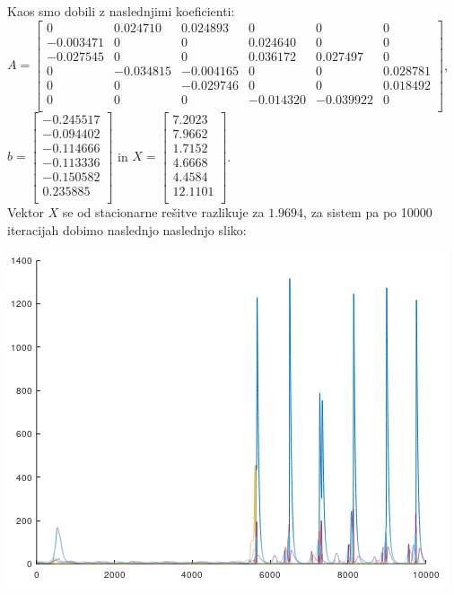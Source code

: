 \documentclass[a4paper, 12pt]{article}
\begin{document}
Kaos smo dobili z naslednjimi koeficienti:\\
$ A =
\begin{bmatrix}
	0 & 0.024710 & 0.024893 & 0 & 0 & 0 \\
	-0.003471 & 0 & 0 & 0.024640 & 0 & 0 \\
	-0.027545 & 0 & 0 & 0.036172 & 0.027497 & 0 \\
	0 & -0.034815 & -0.004165 & 0 & 0 & 0.028781 \\
	0 & 0 & -0.029746 & 0 & 0 & 0.018492 \\
	0 & 0 & 0 & -0.014320 & -0.039922 & 0 \\
\end{bmatrix} $, 
$ b =
\begin{bmatrix}
	-0.245517 \\
	-0.094402 \\
	-0.114666 \\
	-0.113336 \\
	-0.150582 \\
	0.235885 \\
\end{bmatrix} $ in
$ X =
\begin{bmatrix}
	7.2023 \\
	7.9662 \\
	1.7152 \\
	4.6668 \\
	4.4584 \\
	12.1101 \\
\end{bmatrix} $. \\
Vektor $ X $ se od stacionarne rešitve razlikuje za $ 1.9694 $,
za sistem pa po 10000 iteracijah dobimo naslednjo naslednjo sliko:\\
\begin{center}
	\includegraphics{caos.png}
\end{center}
\end{document}
